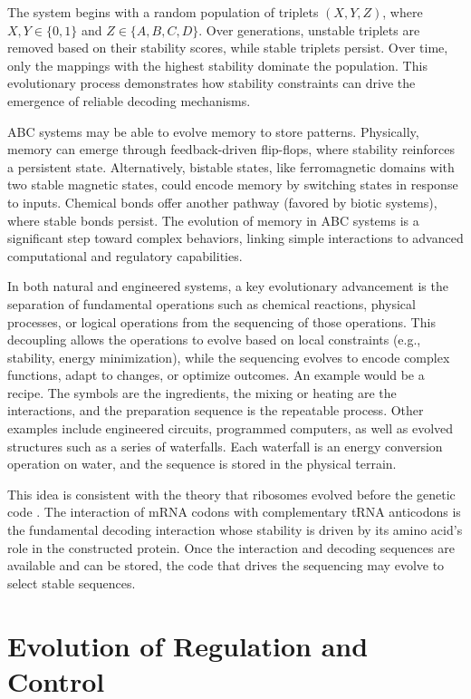 \documentclass[entropy,article,submit,pdftex,moreauthors]{Definitions/mdpi}
\begin{document}
The system begins with a random population of triplets \((X, Y, Z)\), where \(X, Y \in \{0, 1\}\) and \(Z \in \{A, B, C, D\}\). Over generations, unstable triplets are removed based on their stability scores, while stable triplets persist. Over time, only the mappings with the highest stability dominate the population. This evolutionary process demonstrates how stability constraints can drive the emergence of reliable decoding mechanisms.

ABC systems may be able to evolve memory to store patterns. Physically, memory can emerge through feedback-driven flip-flops, where stability reinforces a persistent state. Alternatively, bistable states, like ferromagnetic domains with two stable magnetic states, could encode memory by switching states in response to inputs. Chemical bonds offer another pathway (favored by biotic systems), where stable bonds persist. The evolution of memory in ABC systems is a significant step toward complex behaviors, linking simple interactions to advanced computational and regulatory capabilities.

In both natural and engineered systems, a key evolutionary advancement is the separation of fundamental operations
such as chemical  reactions, physical processes, or logical operations from the sequencing of those operations. This decoupling allows the operations to evolve based on local constraints (e.g., stability, energy minimization), while the sequencing evolves to encode complex functions, adapt to changes, or optimize outcomes. An example would be a recipe. The symbols are the ingredients, the mixing or heating are the interactions, and the preparation sequence is the repeatable process. Other examples include engineered circuits, programmed computers, as well as evolved structures such as a series of waterfalls. Each waterfall is an energy conversion operation on water, and the sequence is stored in the physical terrain.

This idea is consistent with the theory that ribosomes evolved before the genetic code \cite{fox2010origin}. The interaction of mRNA codons with complementary tRNA anticodons is the fundamental decoding interaction whose stability is driven by its amino acid's role in the constructed protein. Once the interaction and decoding sequences are available and can be stored, the code that drives the sequencing may evolve to select stable sequences.

\section{Evolution of Regulation and Control}
\end{document}
